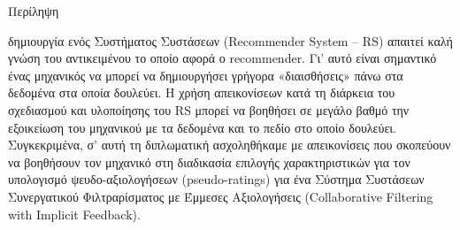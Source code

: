 \pagestyle{plain}
\begin{center}
{\LARGE Περίληψη}\\[1cm]
\end{center}

\lettrine[findent=2pt]{}{ } δημιουργία ενός Συστήματος Συστάσεων (Recommender System – RS) απαιτεί καλή γνώση του αντικειμένου το οποίο αφορά ο recommender. Γι’ αυτό είναι σημαντικό ένας μηχανικός να μπορεί να δημιουργήσει γρήγορα «διαισθήσεις» πάνω στα δεδομένα στα οποία δουλεύει. Η χρήση απεικονίσεων κατά τη διάρκεια του σχεδιασμού και υλοποίησης του RS μπορεί να βοηθήσει σε μεγάλο βαθμό την εξοικείωση του μηχανικού με τα δεδομένα και το πεδίο στο οποίο δουλεύει. Συγκεκριμένα, σ’ αυτή τη διπλωματική ασχοληθήκαμε με απεικονίσεις που σκοπεύουν να βοηθήσουν τον μηχανικό στη διαδικασία επιλογής χαρακτηριστικών για τον υπολογισμό ψευδο-αξιολογήσεων (pseudo-ratings) για ένα Σύστημα Συστάσεων Συνεργατικού Φιλτραρίσματος με Έμμεσες Αξιολογήσεις (Collaborative Filtering with Implicit Feedback). 
